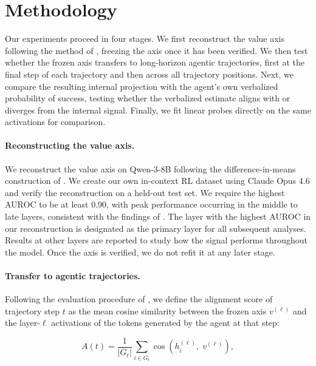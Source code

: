 \section{Methodology}

Our experiments proceed in four stages. We first reconstruct the value axis following the method of \citet{jiang2026value}, freezing the axis once it has been verified. We then test whether the frozen axis transfers to long-horizon agentic trajectories, first at the final step of each trajectory and then across all trajectory positions. Next, we compare the resulting internal projection with the agent's own verbalized probability of success, testing whether the verbalized estimate aligns with or diverges from the internal signal. Finally, we fit linear probes directly on the same activations for comparison.


\paragraph{Reconstructing the value axis.} We reconstruct the value axis on Qwen-3-8B following the difference-in-means construction of \citet{jiang2026value}. We create our own in-context RL dataset using Claude Opus 4.6 and verify the reconstruction on a held-out test set. We require the highest AUROC to be at least 0.90, with peak performance occurring in the middle to late layers, consistent with the findings of \citet{jiang2026value}. The layer with the highest AUROC in our reconstruction is designated as the primary layer for all subsequent analyses. Results at other layers are reported to study how the signal performs throughout the model. Once the axis is verified, we do not refit it at any later stage.

\paragraph{Transfer to agentic trajectories.} Following the evaluation procedure of \citet{jiang2026value}, we define the alignment score of trajectory step $t$ as the mean cosine similarity between the frozen axis $v^{(\ell)}$ and the layer-$\ell$ activations of the tokens generated by the agent at that step:

\begin{equation}
A(t) = \frac{1}{|G_t|} \sum_{i \in G_t} \cos\!\left(h^{(\ell)}_i,\; v^{(\ell)}\right),
\end{equation}


